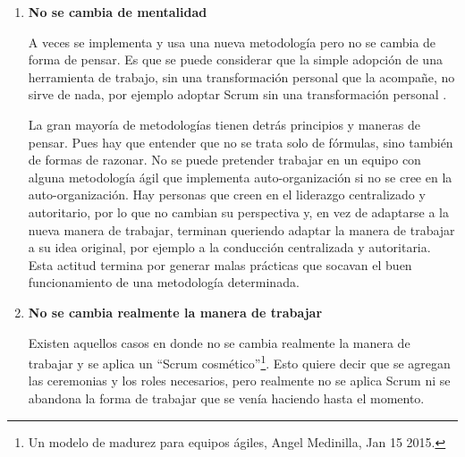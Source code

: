 \begin{enumerate}
Desde esta perspectiva, hay que tener en cuenta que el uso de post-its y gráficos bosquejos que parecen infantiles no debería reemplazar el uso de herramientas conceptuales de diagramación como son: Unified Modeling Language, Architecture Description Language, Business Process Modeling Notation, Conceptual Diagram or ConceptDraw, Causal Loop Diagram, Entity Relationship Diagram, Flow Charts (para control de flujo), Data Flow Diagram, Structure Chart, Stock and Flow Diagrams, Structured Systems Analysis and Design Method, Map Mind Diagram, etc; el uso de dinámicas y conversaciones tampoco debería sustituir el Análisis de Sistemas, Investigación Operativa y las prácticas profesionales\footnote{\cite{SWEBOKv3-2014}} de Ingeniería de software; y la simplicidad no debería desplazar el uso de herramientas de software ni la eliminación de métricas fundamentales. La Ingeniería del Software intenta dar un marco de trabajo en el que se aplican práctica del conocimiento científico en el diseño y construcción de software con mayor calidad. 


\item \textbf{No se cambia de mentalidad}

A veces se implementa y usa una nueva metodología pero no se cambia de forma de pensar. Es que se puede considerar que la simple adopción de una herramienta de trabajo, sin una transformación personal que la acompañe, no sirve de nada, por ejemplo adoptar Scrum sin una transformación personal \cite{Martin-Alaimo-Kleer-2014}. 

La gran mayoría de metodologías tienen detrás principios y maneras de pensar. Pues hay que entender que no se trata solo de fórmulas, sino también de formas de razonar. No se puede pretender trabajar en un equipo con alguna metodología ágil que implementa auto-organización si no se cree en la auto-organización. Hay personas que creen en el liderazgo centralizado y autoritario, por lo que no cambian su perspectiva y, en vez de adaptarse a la nueva manera de trabajar, terminan queriendo adaptar la manera de trabajar a su idea original, por ejemplo a la conducción centralizada y autoritaria. Esta actitud termina por generar malas prácticas que socavan el buen funcionamiento de una metodología determinada.

\item \textbf{No se cambia realmente la manera de trabajar}

Existen aquellos casos en donde no se cambia realmente la manera de trabajar y se aplica un “Scrum cosmético”\footnote{Un modelo de madurez para equipos ágiles, Angel Medinilla, Jan 15 2015.}. Esto quiere decir que se agregan las ceremonias y los roles necesarios, pero realmente no se aplica Scrum ni se abandona la forma de trabajar que se venía haciendo hasta el momento.


\end{enumerate}
